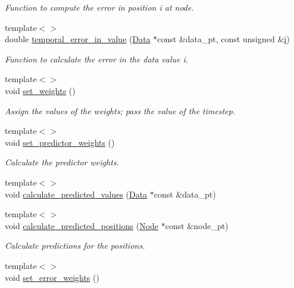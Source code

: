 \begin{DoxyCompactItemize}
\begin{DoxyCompactList}\small\item\em Function to compute the error in position i at node. \end{DoxyCompactList}\item 
{\footnotesize template$<$$>$ }\\double \hyperlink{classoomph_1_1BDF_a315c8cd00516e1e9ff4a0b7954050975}{temporal\+\_\+error\+\_\+in\+\_\+value} (\hyperlink{classoomph_1_1Data}{Data} $\ast$const \&data\+\_\+pt, const unsigned \&\hyperlink{cfortran_8h_adb50e893b86b3e55e751a42eab3cba82}{i})
\begin{DoxyCompactList}\small\item\em Function to calculate the error in the data value i. \end{DoxyCompactList}\item 
{\footnotesize template$<$$>$ }\\void \hyperlink{classoomph_1_1BDF_abaebf93da7392fb90a1f339e2717b4a7}{set\+\_\+weights} ()
\begin{DoxyCompactList}\small\item\em Assign the values of the weights; pass the value of the timestep. \end{DoxyCompactList}\item 
{\footnotesize template$<$$>$ }\\void \hyperlink{classoomph_1_1BDF_a7a436823d855b4148a2a9f5a63ed8f3d}{set\+\_\+predictor\+\_\+weights} ()
\begin{DoxyCompactList}\small\item\em Calculate the predictor weights. \end{DoxyCompactList}\item 
{\footnotesize template$<$$>$ }\\void \hyperlink{classoomph_1_1BDF_abdf120f326bbd903a94e2fd8d17530b2}{calculate\+\_\+predicted\+\_\+values} (\hyperlink{classoomph_1_1Data}{Data} $\ast$const \&data\+\_\+pt)
\item 
{\footnotesize template$<$$>$ }\\void \hyperlink{classoomph_1_1BDF_a86f7aaacfb854380e3f2e6b36c6f0476}{calculate\+\_\+predicted\+\_\+positions} (\hyperlink{classoomph_1_1Node}{Node} $\ast$const \&node\+\_\+pt)
\begin{DoxyCompactList}\small\item\em Calculate predictions for the positions. \end{DoxyCompactList}\item 
{\footnotesize template$<$$>$ }\\void \hyperlink{classoomph_1_1BDF_a2de533281fb6905f22217500e5c03dad}{set\+\_\+error\+\_\+weights} ()

\end{DoxyCompactItemize}

